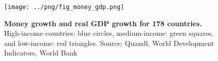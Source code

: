 \begin{figure}[h]
\caption{\label{fig:money_gdp} \textbf{Money growth and real GDP growth for 178 countries.} High-income countries: blue circles, medium-income: green squares, and low-income: red triangles. {\tiny Source: Quandl, World Development Indicators, World Bank}}
\hspace*{-.5cm}\texttt{[image: ../png/fig\_money\_gdp.png]}
\end{figure}